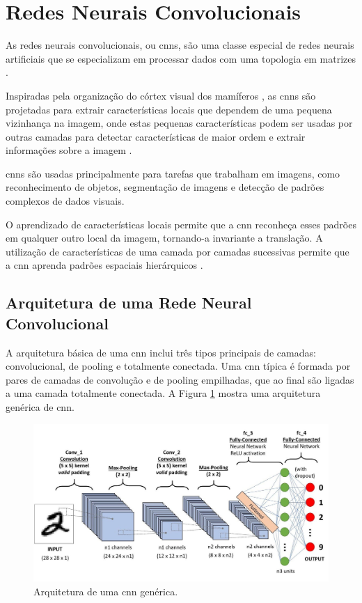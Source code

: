\section{Redes Neurais Convolucionais}

As redes neurais convolucionais, ou \acrshort{cnn}s, são uma classe especial de redes neurais artificiais que se especializam em processar dados com uma topologia em matrizes \cite{Goodfellow-et-al-2016}. 

Inspiradas pela organização do córtex visual dos mamíferos \cite{hubel1962}, as \acrshort{cnn}s são projetadas para 
extrair características locais que dependem de uma pequena vizinhança na imagem, onde estas pequenas características podem ser usadas por outras camadas para detectar características de maior ordem e extrair informações sobre a imagem \cite{book:Bishop}. 

\acrshort{cnn}s são usadas principalmente para tarefas que trabalham em imagens, como reconhecimento de objetos, segmentação de imagens e detecção de padrões complexos de dados visuais.

O aprendizado de características locais permite que a \acrshort{cnn} reconheça esses padrões em qualquer outro local da imagem, tornando-a invariante a translação. A utilização de características de uma camada por camadas sucessivas permite que a \acrshort{cnn} aprenda padrões espaciais hierárquicos \cite{book:Chollet}.

\subsection{Arquitetura de uma Rede Neural Convolucional}

A arquitetura básica de uma \acrshort{cnn} inclui três tipos principais de camadas: convolucional, de pooling e totalmente conectada. 
Uma \acrshort{cnn} típica é formada por pares de camadas de convolução e de pooling empilhadas, que ao final são ligadas a uma camada totalmente conectada.
A Figura \ref{fig:cnn_arch} mostra uma arquitetura genérica de \acrshort{cnn}. 

\begin{figure}[htb]
\centerline{\includegraphics[width=1\linewidth]{images/cnn_placeholder.jpg}}
\caption{Arquitetura de uma \acrshort{cnn} genérica.}
\label{fig:cnn_arch}
\end{figure}

